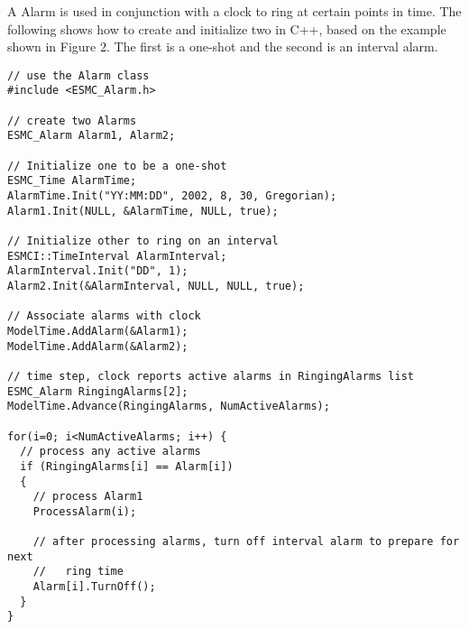 
A Alarm is used in conjunction with a clock to ring at certain points in time.
The following shows how to create and initialize two in C++, based on the
example shown in Figure 2.  The first is a one-shot and the second is an
interval alarm.

\begin{verbatim}
// use the Alarm class
#include <ESMC_Alarm.h>

// create two Alarms
ESMC_Alarm Alarm1, Alarm2;

// Initialize one to be a one-shot
ESMC_Time AlarmTime;
AlarmTime.Init("YY:MM:DD", 2002, 8, 30, Gregorian);
Alarm1.Init(NULL, &AlarmTime, NULL, true);

// Initialize other to ring on an interval
ESMCI::TimeInterval AlarmInterval;
AlarmInterval.Init("DD", 1);
Alarm2.Init(&AlarmInterval, NULL, NULL, true);

// Associate alarms with clock
ModelTime.AddAlarm(&Alarm1);
ModelTime.AddAlarm(&Alarm2);

// time step, clock reports active alarms in RingingAlarms list
ESMC_Alarm RingingAlarms[2];
ModelTime.Advance(RingingAlarms, NumActiveAlarms);

for(i=0; i<NumActiveAlarms; i++) {
  // process any active alarms
  if (RingingAlarms[i] == Alarm[i])
  {
    // process Alarm1
    ProcessAlarm(i);

    // after processing alarms, turn off interval alarm to prepare for next
    //   ring time
    Alarm[i].TurnOff();
  }
}
\end{verbatim}
